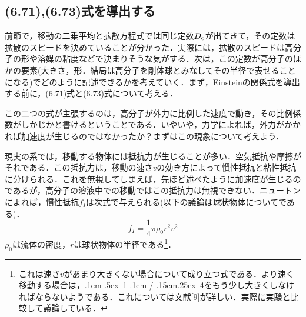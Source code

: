 \documentclass{jsarticle}
\newcommand{\FRAC}[2]{\leavevmode\kern.1em
 \raise.5ex\hbox{\the\scriptfont0 #1}\kern-.1em
 /\kern-.15em\lower.25ex\hbox{\the\scriptfont0 #2}}
\begin{document}
\subsection{(6.71),(6.73)式を導出する}
前節で，移動の二乗平均と拡散方程式では同じ定数$D_{\scalebox{0.5}{G}}$が出てきて，その定数は拡散のスピードを決めていることが分かった．実際には，拡散のスピードは高分子の形や溶媒の粘度などで決まりそうな気がする．次は，この定数が高分子のほかの要素(大きさ，形．結局は高分子を剛体球とみなしてその半径で表せることになる)でどのように記述できるかを考えていく．まず，Einsteinの関係式を導出する前に，(6.71)式と(6.73)式について考える．

この二つの式が主張するのは，高分子が外力に比例した速度で動き，その比例係数がしかじかと書けるということである．いやいや，力学によれば，外力がかかれば加速度が生じるのではなかったか？まずはこの現象について考えよう．

現実の系では，移動する物体には抵抗力が生じることが多い．空気抵抗や摩擦がそれである．この抵抗力は，移動の速さ$v$の効き方によって慣性抵抗と粘性抵抗に分けられる．これを無視してしまえば，先ほど述べたように加速度が生じるのであるが，高分子の溶液中での移動ではこの抵抗力は無視できない．ニュートンによれば，慣性抵抗$f_I$は次式で与えられる(以下の議論は球状物体についてである)．
\begin{equation}
f_I = \frac{1}{4} \pi \rho _0 r^2 v^2
\end{equation}
$\rho _0$は流体の密度，$r$は球状物体の半径である\footnote{これは速さ$v$があまり大きくない場合について成り立つ式である．より速く移動する場合は，\FRAC{1}{4}をもう少し大きくしなければならないようである．これについては文献[9]が詳しい．実際に実験と比較して議論している．}．
\end{document}
